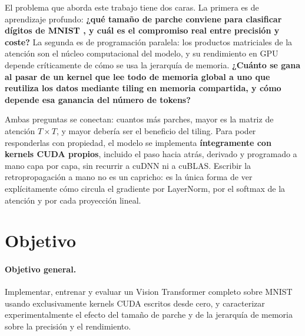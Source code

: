 \documentclass[11pt,a4paper]{article}
\begin{document}
El problema que aborda este trabajo tiene dos caras. La primera es de
aprendizaje profundo: \textbf{¿qué tamaño de parche conviene para clasificar
dígitos de MNIST \cite{lecun1998gradient}, y cuál es el compromiso real entre
precisión y coste?} La segunda es de programación paralela: los productos
matriciales de la atención son el núcleo computacional del modelo, y su
rendimiento en GPU depende críticamente de cómo se usa la jerarquía de memoria.
\textbf{¿Cuánto se gana al pasar de un kernel que lee todo de memoria global a
uno que reutiliza los datos mediante tiling en memoria compartida, y cómo
depende esa ganancia del número de tokens?}

Ambas preguntas se conectan: cuantos más parches, mayor es la matriz de
atención $T \times T$, y mayor debería ser el beneficio del tiling. Para poder
responderlas con propiedad, el modelo se implementa \textbf{íntegramente con
kernels CUDA propios}, incluido el paso hacia atrás, derivado y programado a
mano capa por capa, sin recurrir a cuDNN ni a cuBLAS. Escribir la
retropropagación a mano no es un capricho: es la única forma de ver
explícitamente cómo circula el gradiente por LayerNorm, por el softmax de la
atención y por cada proyección lineal.

\section{Objetivo}

\paragraph{Objetivo general.} Implementar, entrenar y evaluar un Vision
Transformer completo sobre MNIST usando exclusivamente kernels CUDA escritos
desde cero, y caracterizar experimentalmente el efecto del tamaño de parche y
de la jerarquía de memoria sobre la precisión y el rendimiento.
\end{document}
